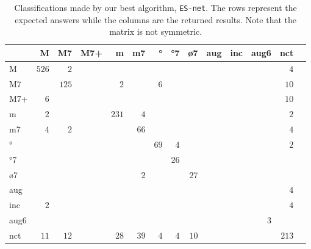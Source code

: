 \documentclass{article}
\begin{document}
\begin{table*}
\centering
\begin{tabular}{l||r|r|r|r|r|r|r|r|r|r|r|r|r}
      &     M &    M7 &   M7+ &     m &    m7 &    ° &   °7 &   ø7 &   aug &   inc &  aug6 &   nct \\  \hline \hline
    M & $ 526 $ & $   2 $ & $     $ & $     $ & $     $ & $     $ & $     $ & $     $ & $     $ & $     $ & $     $ & $   4 $ \\ \hline
   M7 & $     $ & $ 125 $ & $     $ & $   2 $ & $     $ & $   6 $ & $     $ & $     $ & $     $ & $     $ & $     $ & $  10 $ \\ \hline
  M7+ & $   6 $ & $     $ & $     $ & $     $ & $     $ & $     $ & $     $ & $     $ & $     $ & $     $ & $     $ & $  10 $ \\ \hline
    m & $   2 $ & $     $ & $     $ & $ 231 $ & $   4 $ & $     $ & $     $ & $     $ & $     $ & $     $ & $     $ & $   2 $ \\ \hline
   m7 & $   4 $ & $   2 $ & $     $ & $     $ & $  66 $ & $     $ & $     $ & $     $ & $     $ & $     $ & $     $ & $   4 $ \\ \hline
   ° & $     $ & $     $ & $     $ & $     $ & $     $ & $  69 $ & $   4 $ & $     $ & $     $ & $     $ & $     $ & $   2 $ \\ \hline
  °7 & $     $ & $     $ & $     $ & $     $ & $     $ & $     $ & $  26 $ & $     $ & $     $ & $     $ & $     $ & $     $ \\ \hline
  ø7 & $     $ & $     $ & $     $ & $     $ & $   2 $ & $     $ & $     $ & $  27 $ & $     $ & $     $ & $     $ & $     $ \\ \hline
  aug & $     $ & $     $ & $     $ & $     $ & $     $ & $     $ & $     $ & $     $ & $     $ & $     $ & $     $ & $   4 $ \\ \hline
  inc & $   2 $ & $     $ & $     $ & $     $ & $     $ & $     $ & $     $ & $     $ & $     $ & $     $ & $     $ & $   4 $ \\ \hline
 aug6 & $     $ & $     $ & $     $ & $     $ & $     $ & $     $ & $     $ & $     $ & $     $ & $     $ & $   3 $ & $     $ \\ \hline
  nct & $  11 $ & $  12 $ & $     $ & $  28 $ & $  39 $ & $   4 $ & $   4 $ & $  10 $ & $     $ & $     $ & $     $ & $ 213 $ \\ \hline
\end{tabular}
\caption{Classifications made by our best algorithm, \texttt{ES-net}. The rows represent
  the expected answers while the columns are the returned
  results. Note that the matrix is not symmetric.}
\label{tab:erros-es-net}
\end{table*}
\end{document}
